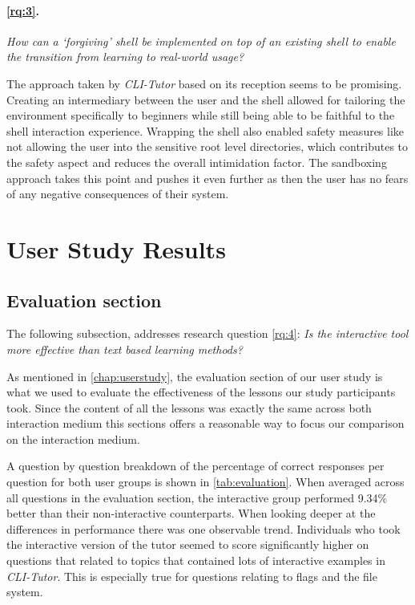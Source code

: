 \paragraph{\ref{rq:3}.} \textit{How can a `forgiving' shell be implemented on top of an existing
shell to enable the transition from learning to real-world usage?}

The approach taken by \textit{CLI-Tutor} based on its reception seems to be
promising. Creating an intermediary between the user and the shell allowed for
tailoring the environment specifically to beginners while still being able to
be faithful to the shell interaction experience. Wrapping the shell also enabled
safety measures like not allowing the user into the sensitive root level
directories, which contributes to the safety aspect and reduces the overall
intimidation factor. The sandboxing approach takes this point and pushes it
even further as then the user has no fears of any negative consequences of their system.



\section{User Study Results}

\subsection{Evaluation section}

The following subsection, addresses research question \ref{rq:4}: \textit{Is
    the interactive tool more effective than text based learning
methods?}

As mentioned in \autoref{chap:userstudy}, the evaluation section of our user
study is what we used to evaluate the effectiveness of the lessons our study
participants took. Since the content of all the lessons was exactly the same
across both interaction medium this sections offers a reasonable way to focus
our comparison on the interaction medium.

A question by question breakdown of the percentage of correct responses per
question for both user groups is shown in \autoref{tab:evaluation}. When
averaged across all questions in the evaluation section, the interactive group
performed 9.34\% better than their non-interactive counterparts. When looking
deeper at the differences in performance there was one observable trend.
Individuals who took the interactive version of the tutor seemed to score
significantly higher on questions that related to topics that contained lots of
interactive examples in \textit{CLI-Tutor}. This is especially true for
questions relating to flags and the file system.  

